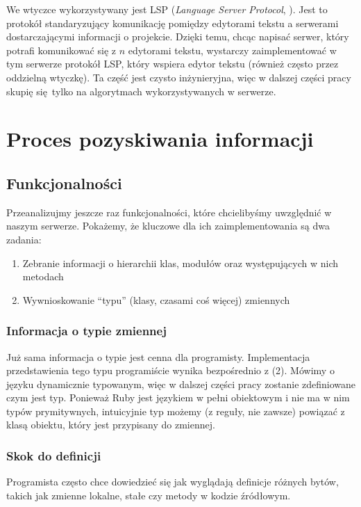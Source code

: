 \documentclass[declaration,shortabstract,mgr]{iithesis}
\begin{document}
We wtyczce wykorzystywany jest LSP (\textit{Language Server Protocol}, \cite{LSP}).
Jest to protokół standaryzujący komunikację pomiędzy edytorami tekstu a serwerami dostarczającymi informacji o projekcie.
Dzięki temu, chcąc napisać serwer, który potrafi komunikować się z $n$ edytorami tekstu, wystarczy zaimplementować w tym serwerze protokół LSP, który wspiera edytor tekstu (również często przez oddzielną wtyczkę). Ta część jest czysto inżynieryjna, więc w dalszej części pracy skupię się tylko na algorytmach wykorzystywanych w serwerze.

\section{Proces pozyskiwania informacji}

\subsection{Funkcjonalności}

Przeanalizujmy jeszcze raz funkcjonalności, które chcielibyśmy uwzględnić w naszym serwerze. Pokażemy, że kluczowe  dla ich zaimplementowania są dwa zadania:
\begin{enumerate}
\item Zebranie informacji o hierarchii klas, modułów oraz występujących w nich metodach
\item Wywnioskowanie ``typu'' (klasy, czasami coś więcej) zmiennych
\end{enumerate}

\subsubsection{Informacja o typie zmiennej}

Już sama informacja o typie jest cenna dla programisty. Implementacja przedstawienia tego typu programiście wynika bezpośrednio z (2).
Mówimy o języku dynamicznie typowanym, więc w dalszej części pracy zostanie zdefiniowane czym jest typ. Ponieważ Ruby jest językiem w pełni obiektowym i nie ma w nim typów prymitywnych, intuicyjnie typ możemy (z reguły, nie zawsze) powiązać z klasą obiektu, który jest przypisany do zmiennej.

\subsubsection{Skok do definicji}

Programista często chce dowiedzieć się jak wyglądają definicje różnych bytów, takich jak zmienne lokalne, stałe czy metody w kodzie źródłowym.
\end{document}
